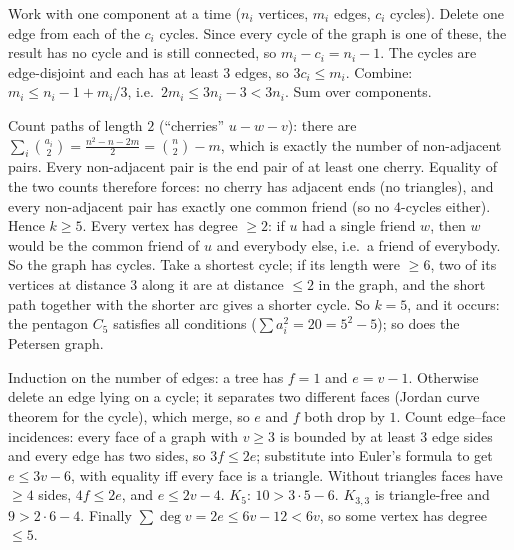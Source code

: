 \documentclass[11pt,a4paper]{article}
\begin{document}
Work with one component at a time (\(n_i\) vertices, \(m_i\) edges, \(c_i\) cycles). Delete one edge from each of the \(c_i\) cycles. Since every cycle of the graph is one of these, the result has no cycle and is still connected, so \(m_i-c_i=n_i-1\).
The cycles are edge-disjoint and each has at least \(3\) edges, so \(3c_i\le m_i\). Combine: \(m_i\le n_i-1+m_i/3\), i.e.\ \(2m_i\le3n_i-3\lt3n_i\). Sum over components.

Count paths of length \(2\) (``cherries'' \(u\!-\!w\!-\!v\)): there are \(\sum_i\binom{a_i}2=\frac{n^2-n-2m}2=\binom n2-m\), which is exactly the number of non-adjacent pairs.
Every non-adjacent pair is the end pair of at least one cherry. Equality of the two counts therefore forces: no cherry has adjacent ends (no triangles), and every non-adjacent pair has exactly one common friend (so no \(4\)-cycles either). Hence \(k\ge5\).
Every vertex has degree \(\ge2\): if \(u\) had a single friend \(w\), then \(w\) would be the common friend of \(u\) and everybody else, i.e.\ a friend of everybody. So the graph has cycles. Take a shortest cycle; if its length were \(\ge6\), two of its vertices at distance \(3\) along it are at distance \(\le2\) in the graph, and the short path together with the shorter arc gives a shorter cycle.
So \(k=5\), and it occurs: the pentagon \(C_5\) satisfies all conditions (\(\sum a_i^2=20=5^2-5\)); so does the Petersen graph.

Induction on the number of edges: a tree has \(f=1\) and \(e=v-1\). Otherwise delete an edge lying on a cycle; it separates two different faces (Jordan curve theorem for the cycle), which merge, so \(e\) and \(f\) both drop by \(1\).
Count edge--face incidences: every face of a graph with \(v\ge3\) is bounded by at least \(3\) edge sides and every edge has two sides, so \(3f\le2e\); substitute into Euler's formula to get \(e\le3v-6\), with equality iff every face is a triangle. Without triangles faces have \(\ge4\) sides, \(4f\le2e\), and \(e\le2v-4\).
\(K_5\): \(10\gt3\cdot5-6\). \(K_{3,3}\) is triangle-free and \(9\gt2\cdot6-4\). Finally \(\sum\deg v=2e\le6v-12\lt6v\), so some vertex has degree \(\le5\).
\end{document}
